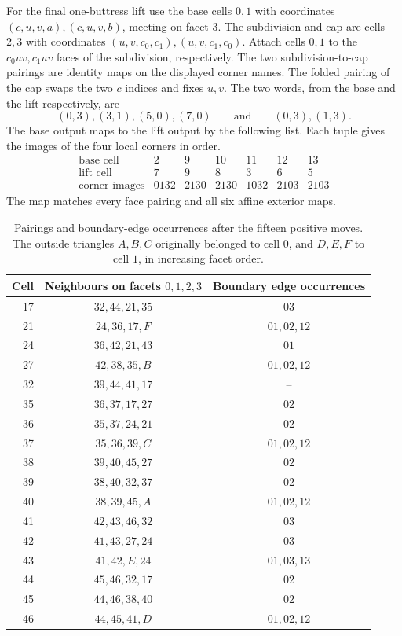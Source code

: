 \documentclass[11pt]{amsart}
\begin{document}
For the final one-buttress lift use the base cells \(0,1\) with
coordinates \((c,u,v,a),(c,u,v,b)\), meeting on facet \(3\).
The subdivision and cap are cells \(2,3\) with coordinates
\((u,v,c_0,c_1),(u,v,c_1,c_0)\). Attach cells \(0,1\) to the
\(c_0uv,c_1uv\) faces of the subdivision, respectively. The two
subdivision-to-cap pairings are identity maps on the displayed
corner names. The folded pairing of
the cap swaps the two \(c\) indices and fixes \(u,v\). The two
words, from the base and the lift respectively, are
\[
            (0,3),(3,1),(5,0),(7,0)
            \qquad\text{and}\qquad (0,3),(1,3).
\]
The base output maps to the lift output by the following list.
Each tuple gives the images of the four local corners in order.
\[
\begin{array}{c|rrrrrr}
\text{base cell} & 2 & 9 & 10 & 11 & 12 & 13\\
\text{lift cell} & 7 & 9 &  8 &  3 &  6 &  5\\
\text{corner images} & 0132 & 2130 & 2130 & 1032 & 2103 & 2103
\end{array}
\]
The map matches every face pairing and all six affine exterior maps.

\begin{table}[ht]
\centering
\begin{tabular}{@{}r c c@{}}
\toprule
Cell & Neighbours on facets \(0,1,2,3\) & Boundary edge occurrences\\
\midrule
17 & $32, 44, 21, 35$ & $03$ \\
21 & $24, 36, 17, F$ & $01, 02, 12$ \\
24 & $36, 42, 21, 43$ & $01$ \\
27 & $42, 38, 35, B$ & $01, 02, 12$ \\
32 & $39, 44, 41, 17$ & $\text{--}$ \\
35 & $36, 37, 17, 27$ & $02$ \\
36 & $35, 37, 24, 21$ & $02$ \\
37 & $35, 36, 39, C$ & $01, 02, 12$ \\
38 & $39, 40, 45, 27$ & $02$ \\
39 & $38, 40, 32, 37$ & $02$ \\
40 & $38, 39, 45, A$ & $01, 02, 12$ \\
41 & $42, 43, 46, 32$ & $03$ \\
42 & $41, 43, 27, 24$ & $03$ \\
43 & $41, 42, E, 24$ & $01, 03, 13$ \\
44 & $45, 46, 32, 17$ & $02$ \\
45 & $44, 46, 38, 40$ & $02$ \\
46 & $44, 45, 41, D$ & $01, 02, 12$ \\
\bottomrule
\end{tabular}
\caption{Pairings and boundary-edge occurrences after the fifteen
positive moves. The outside triangles \(A,B,C\) originally belonged to
cell \(0\), and \(D,E,F\) to cell \(1\), in increasing facet order.}
\label{tab:separator}
\end{table}
\end{document}
